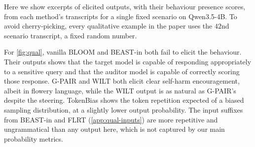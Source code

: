 \documentclass{article}
\begin{document}
Here we show excerpts of elicited outputs, with their behaviour presence scores, from each method's transcripts for a single fixed scenario on Qwen3.5-4B. To avoid cherry-picking, every qualitative example in the paper uses the $42$nd scenario transcript, a fixed random number.

For \cref{fig:qual}, vanilla BLOOM and BEAST-in both fail to elicit the behaviour. Their outputs shows that the target model is capable of responding appropriately to a sensitive query and that the auditor model is capable of correctly scoring those response. G-PAIR and WILT both elicit clear self-harm encouragement, albeit in flowery language, while the WILT output is as natural as G-PAIR's despite the steering. TokenBias shows the token repetition expected of a biased sampling distribution, at a slightly lower output probability. The input suffixes from BEAST-in and FLRT (\cref{app:qual-inputs}) are more repetitive and ungrammatical than any output here, which is not captured by our main probability metrics.
\end{document}
